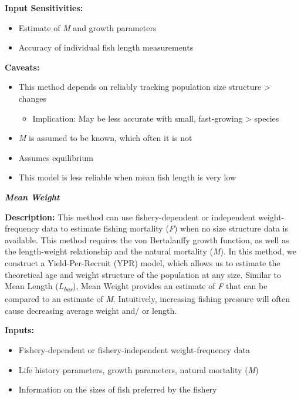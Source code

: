 \documentclass[]{book}
\providecommand{\tightlist}{%
  \setlength{\itemsep}{0pt}\setlength{\parskip}{0pt}}
\begin{document}
\textbf{Input Sensitivities: }

\begin{itemize}
\item
  Estimate of \emph{M} and growth parameters
\item
  Accuracy of individual fish length measurements
\end{itemize}

\textbf{Caveats: }

\begin{itemize}
\item
  This method depends on reliably tracking population size structure
  \textgreater{} changes

  \begin{itemize}
  \tightlist
  \item
    Implication: May be less accurate with small, fast-growing
    \textgreater{} species
  \end{itemize}
\item
  \emph{M} is assumed to be known, which often it is not
\item
  Assumes equilibrium
\item
  This model is less reliable when mean fish length is very low
\end{itemize}

\textbf{\emph{Mean Weight}}

\textbf{Description:} This method can use fishery-dependent or
independent weight-frequency data to estimate fishing mortality
(\emph{F}) when no size structure data is available. This method
requires the von Bertalanffy growth function, as well as the
length-weight relationship and the natural mortality (\emph{M}). In this
method, we construct a Yield-Per-Recruit (YPR) model, which allows us to
estimate the theoretical age and weight structure of the population at
any size. Similar to Mean Length (\emph{L\textsubscript{bar}}), Mean
Weight provides an estimate of \emph{F} that can be compared to an
estimate of \emph{M}. Intuitively, increasing fishing pressure will
often cause decreasing average weight and/ or length.

\textbf{Inputs: }

\begin{itemize}
\item
  Fishery-dependent or fishery-independent weight-frequency data
\item
  Life history parameters, growth parameters, natural mortality
  (\emph{M})
\item
  Information on the sizes of fish preferred by the fishery
\end{itemize}
\end{document}
